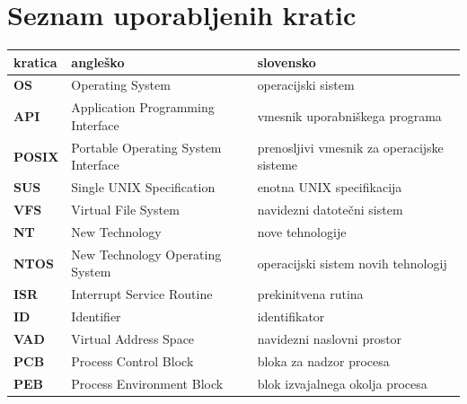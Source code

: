 \documentclass[a4paper,12pt,openright]{book}
\newcommand{\clearemptydoublepage}{\newpage{\pagestyle{empty}\cleardoublepage}}
\begin{document}
\pagestyle{empty}
\def\thepage{}%
\tableofcontents{}


\clearemptydoublepage


\chapter*{Seznam uporabljenih kratic}

\noindent\begin{tabular}{p{}|p{}|p{}}    %
{\bf kratica} & {\bf angleško}                     & {\bf slovensko}                            \\
\hline
{\bf OS}      & Operating System                    & operacijski sistem                         \\
{\bf API}     & Application Programming Interface   & vmesnik uporabniškega programa             \\
{\bf POSIX}   & Portable Operating System Interface & prenosljivi vmesnik za operacijske sisteme \\
{\bf SUS}     & Single UNIX Specification           & enotna UNIX specifikacija                  \\
{\bf VFS}     & Virtual File System                 & navidezni datotečni sistem                 \\
{\bf NT}      & New Technology                      & nove tehnologije                           \\
{\bf NTOS}    & New Technology Operating System     & operacijski sistem novih tehnologij        \\
{\bf ISR}     & Interrupt Service Routine           & prekinitvena rutina                        \\
{\bf ID}      & Identifier                          & identifikator                              \\
{\bf VAD}     & Virtual Address Space               & navidezni naslovni prostor                 \\
{\bf PCB}     & Process Control Block               & bloka za nadzor procesa                    \\
{\bf PEB}     & Process Environment Block           & blok izvajalnega okolja procesa            \\

\end{tabular}
\end{document}
